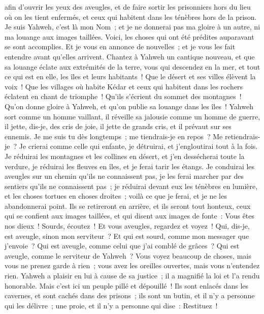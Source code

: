 \begin{multicols}{2}
afin d'ouvrir les yeux des aveugles, et de faire sortir les prisonniers hors du lieu où on les tient enfermés, et ceux qui habitent dans les ténèbres hors de la prison.
Je suis Yahweh, c'est là mon Nom~; et je ne donnerai pas ma gloire à un autre, ni ma louange aux images taillées.
Voici, les choses qui ont été prédites auparavant se sont accomplies. Et je vous en annonce de nouvelles~; et je vous les fait entendre avant qu'elles arrivent.
Chantez à Yahweh un cantique nouveau, et que sa louange éclate aux extrémités de la terre, vous qui descendez en la mer, et tout ce qui est en elle, les îles et leurs habitants~!
Que le désert et ses villes élèvent la voix~! Que les villages où habite Kédar et ceux qui habitent dans les rochers éclatent en chant de triomphe~! Qu'ils s'écrient du sommet des montagnes~!
Qu'on donne gloire à Yahweh, et qu'on publie sa louange dans les îles~!
Yahweh sort comme un homme vaillant, il réveille sa jalousie comme un homme de guerre, il jette, dis-je, des cris de joie, il jette de grands cris, et il prévaut sur ses ennemis.
Je me suis tu dès longtemps~; me tiendrais-je en repos~? Me retiendrais-je~? Je crierai comme celle qui enfante, je détruirai, et j'engloutirai tout à la fois.
Je réduirai les montagnes et les collines en désert, et j'en dessécherai toute la verdure, je réduirai les fleuves en îles, et je ferai tarir les étangs.
Je conduirai les aveugles sur un chemin qu'ils ne connaissent pas, je les ferai marcher par des sentiers qu'ils ne connaissent pas~; je réduirai devant eux les ténèbres en lumière, et les choses tortues en choses droites~; voilà ce que je ferai, et je ne les abandonnerai point.
Ils se retireront en arrière, et ils seront tout honteux, ceux qui se confient aux images taillées, et qui disent aux images de fonte~: Vous êtes nos dieux~!
Sourds, écoutez~! Et vous aveugles, regardez et voyez~!
Qui, dis-je, est aveugle, sinon mon serviteur~? Et qui est sourd, comme mon messager que j'envoie~? Qui est aveugle, comme celui que j'ai comblé de grâces~? Qui est aveugle, comme le serviteur de Yahweh~?
Vous voyez beaucoup de choses, mais vous ne prenez garde à rien~; vous avez les oreilles ouvertes, mais vous n'entendez rien.
Yahweh a plaisir en lui à cause de sa justice~; il a magnifié la loi et l'a rendu honorable. 
Mais c'est ici un peuple pillé et dépouillé~! Ils sont enlacés dans les cavernes, et sont cachés dans des prisons~; ils sont un butin, et il n'y a personne qui les délivre~; une proie, et il n'y a personne qui dise~: Restituez~!

\end{multicols}
